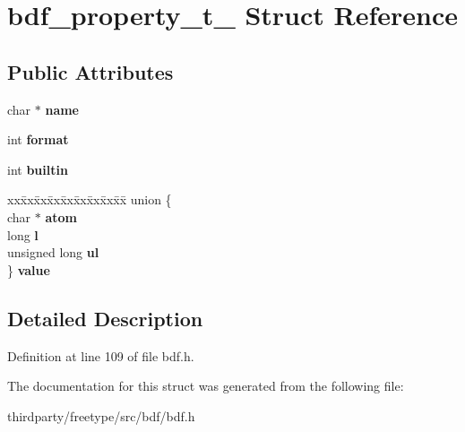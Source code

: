 \hypertarget{structbdf__property__t__}{}\section{bdf\+\_\+property\+\_\+t\+\_\+ Struct Reference}
\label{structbdf__property__t__}
\subsection*{Public Attributes}
\begin{DoxyCompactItemize}
\item 
\mbox{\label{structbdf__property__t___a61ccd4a2803d934a69a86c5e00a71037}} 
char $\ast$ {\bfseries name}
\item 
\mbox{\label{structbdf__property__t___a44b9e9cd4cebf80e8c5b8d538c0b9b56}} 
int {\bfseries format}
\item 
\mbox{\label{structbdf__property__t___aa54a02c4da06f9bc10f6ded941a8e32f}} 
int {\bfseries builtin}
\item 
\mbox{\label{structbdf__property__t___a4371e43bdd05b282d19f5b8f03527e8d}} 
\begin{tabbing}
xx\=xx\=xx\=xx\=xx\=xx\=xx\=xx\=xx\=\kill
union \{\\
\>char $\ast$ {\bfseries atom}\\
\>long {\bfseries l}\\
\>unsigned long {\bfseries ul}\\
\} {\bfseries value}\\

\end{tabbing}\end{DoxyCompactItemize}


\subsection{Detailed Description}


Definition at line 109 of file bdf.\+h.



The documentation for this struct was generated from the following file\+:\begin{DoxyCompactItemize}
\item 
thirdparty/freetype/src/bdf/bdf.\+h\end{DoxyCompactItemize}
